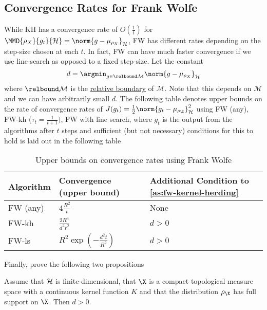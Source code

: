 \subsection{Convergence Rates for Frank Wolfe}
\label{sec:org9640d5f} While KH has a convergence rate of \(O(\frac{1}{t})\) for
\(\MMD{\rho_{X}}{g_t}{\rkhs{H}} = \norm{g - \mu_{\rho_{X}}}_{\rkhs{H}}\), FW
has different rates depending on the step-size chosen at each \(t\). In fact, FW
can have much faster convergence if we use line-search as opposed to a fixed
step-size. Let the constant
\begin{equation}
\label{eq:d-radius-of-biggest-interior-ball} d = \argmin_{g \in \relbound
\mathcal{M}} \norm{g - \mu_{\rho_X}}_{\rkhs{H}}
\end{equation} where \(\relbound \mathcal{M}\) is the
\hyperref[def:relative-boundary]{relative boundary} of \(\mathcal{M}\). Note
that this depends on \(\mathcal{M}\) and we can have arbitrarily small \(d\).
The following table denotes upper bounds on the rate of convergence rates of
\(J(g_{t}) = \frac{1}{2} \norm{g_{t} - \mu_{\rho_{\X}}}^{2}_{\rkhs{H}}\)
using FW (any), FW-kh (\(\tau_{t} =
\frac{1}{t+1})\), FW with line search, where \(g_{t}\) is
the output from the algorithms after \(t\) steps and sufficient (but not
necessary) conditions for this to hold is laid out in the following table

\begin{table}[htbp]
  \caption{\label{tbl:FW-convergence-table}Upper bounds on convergence rates using
Frank Wolfe} \centering
\begin{tabular}{lll} \hline Algorithm & Convergence (upper bound) & Additional
Condition to \ref{as:fw-kernel-herding}\\ \hline FW (any) & \(4\frac{R^{2}}{t}\)
& None\\ FW-kh & \(\frac{2R^{4}}{d^{2}t^{2}}\) & \(d > 0\)\\ FW-ls & \(R^{2}
\exp(-\frac{d^{2}t}{R^{2}})\) & \(d > 0\)\\ \hline
\end{tabular}
\end{table}

Finally, \citep{bach12_equiv_between_herdin_condit_gradien_algor} prove the following two propositions
\begin{proposition}
\label{prop:finite-dim-fw-has-speedup} Assume that \(\mathcal{H}\) is
finite-dimensional, that \(\X\) is a compact topological measure space with a
continuous kernel function \(K\) and that the distribution \(\rho_{\X}\) has
full support on \(\X\). Then \(d > 0\).
\end{proposition}

